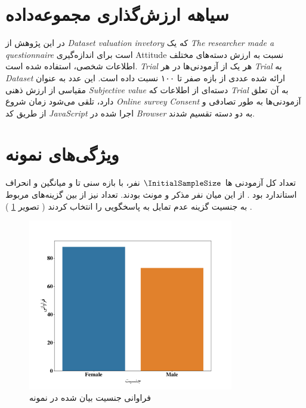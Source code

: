 \section{سیاهه ارزش‌گذاری مجموعه‌داده}
در این پژوهش از
{\textit{\gls{Dataset valuation invetory}}}
که یک
{\textit{\gls{The researcher made a questionnaire}}}
است برای اندازه‌گیری
\gls{Attitude}
نسبت به ارزش دسته‌های مختلف اطلاعات شخصی، استفاده شده است.
\textit{\gls{Trial}}
هر یک از آزمودنی‌ها در هر
\textit{\gls{Trial}}
به
\textit{\gls{Dataset}}
ارائه شده عددی از بازه صفر تا ۱۰۰ نسبت داده است. این عدد به عنوان مقیاسی از ارزش ذهنی
\textit{\gls{Subjective value}}
دسته‌ای از اطلاعات که
\textit{\gls{Trial}}
به آن تعلق دارد، تلقی می‌شود
زمان شروع
\textit{\gls{Online survey}}
\textit{\gls{Consent}}
آزمودنی‌ها به طور تصادفی و از طریق کد
\textit{\gls{JavaScript}}
اجرا شده در
\textit{\gls{Browser}}
به دو دسته تقسیم شدند.
\section{ویژگی‌های نمونه}
تعداد کل آزمودنی ها
$\InitialSampleSize$
نفر،
با بازه سنی
\ageMin
تا
\ageMax
و
میانگین
\sampleAgeMean
و انحراف استاندارد
\sampleAgeSD
بود
\!.
از این میان
\SampleSizeMale
نفر مذکر و
\SampleSizeFemale
مونث بودند.
تعداد
\SampleSizeSexualityNoAnswer
نیز از بین گزینه‌های مربوط به جنسیت گزینه عدم تمایل به پاسخگویی را انتخاب کردند
(
تصویر \ref{fig:sexualityAgainstPopulation}
)
\!.


% 

\begin{figure}[htpb]
    \centering
    \includegraphics[width=0.8\textwidth]{./img/sexualityAgainstPopulation.pdf}
    \caption{فراوانی جنسیت بیان شده در نمونه}
    \label{fig:sexualityAgainstPopulation}
\end{figure}

